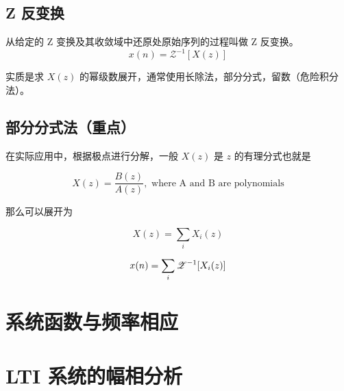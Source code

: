 \documentclass[cn,11pt,chinese,black,simple]{../elegantbook}
\begin{document}
\subsection{Z 反变换}

\begin{definition}[Z 反变换]
    从给定的 Z 变换及其收敛域中还原处原始序列的过程叫做 Z 反变换。
    \[x(n) = \mathscr{Z}^{-1}[X(z)]\]

    实质是求 \(X(z)\) 的幂级数展开，通常使用长除法，部分分式，留数（危险积分法）。
\end{definition}

\subsection*{部分分式法（重点）}

在实际应用中，根据极点进行分解，一般 \(X(z)\) 是 \(z\) 的有理分式也就是

\[X(z) = \frac{B(z)}{A(z)}, \text{ where A and B are polynomials}\]

那么可以展开为 

\[X(z) = \sum_i X_i(z)\]

\[x(n) = \sum_i \mathscr{Z}^{-1}[X_i (z)]\]

\section{系统函数与频率相应}

\section{LTI 系统的幅相分析}

\let\chapname\undefined
\ifx\mainclass\undefined
\end{document}
